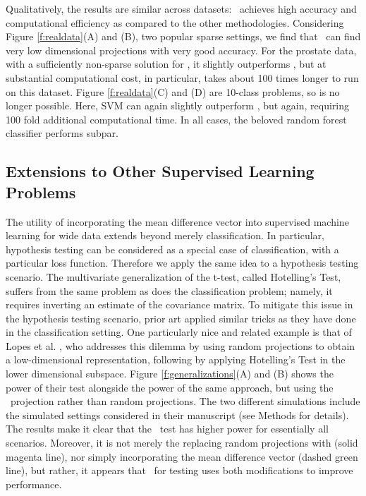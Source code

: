 \documentclass[10pt]{article}
\begin{document}
Qualitatively, the results are similar across datasets: \Lol~achieves high accuracy and computational efficiency as compared to the other methodologies.  Considering Figure \ref{f:realdata}(A) and (B), two popular sparse settings, we find that \Lol~can find very low dimensional projections with very good accuracy. For the prostate data, with a sufficiently non-sparse solution for , it slightly outperforms \Lol, but at substantial computational cost, in particular,  takes about 100 times longer to run on this dataset.   Figure \ref{f:realdata}(C) and (D) are 10-class problems, so  is no longer possible.  Here, SVM can again slightly outperform \Lol, but again, requiring 100 fold additional computational time.  In all cases, the beloved random forest classifier performs subpar.


\subsection*{Extensions to Other Supervised Learning Problems}

The utility of incorporating the mean difference vector into supervised machine learning for wide data extends beyond merely classification.  In particular, hypothesis testing can be considered as a special case of classification, with a particular loss function.  Therefore we apply the same idea to a hypothesis testing scenario.  The multivariate generalization of the t-test, called Hotelling's Test, suffers from the same problem as does the classification problem; namely, it requires inverting an estimate of the covariance matrix. To mitigate this issue in the hypothesis testing scenario, prior art applied similar tricks as they have done in the classification setting. One particularly nice and related example is that of  Lopes et al. \cite{Lopes2011a}, who addresses this dilemma by using random projections to obtain a low-dimensional representation, following by applying Hotelling's Test in the lower dimensional subspace.  Figure \ref{f:generalizations}(A) and (B) shows the power of their test alongside the power of the same approach, but using the \Lol~projection rather than random projections.  The two different simulations include the simulated settings considered in their manuscript (see Methods for details).  The results make it clear that the \Lol~test has higher power for essentially all scenarios.  Moreover, it is not merely the replacing random projections with \Pca (solid magenta line), nor simply incorporating the mean difference vector (dashed green line), but rather, it appears that \Lol~for testing uses both modifications to improve performance.
\end{document}
